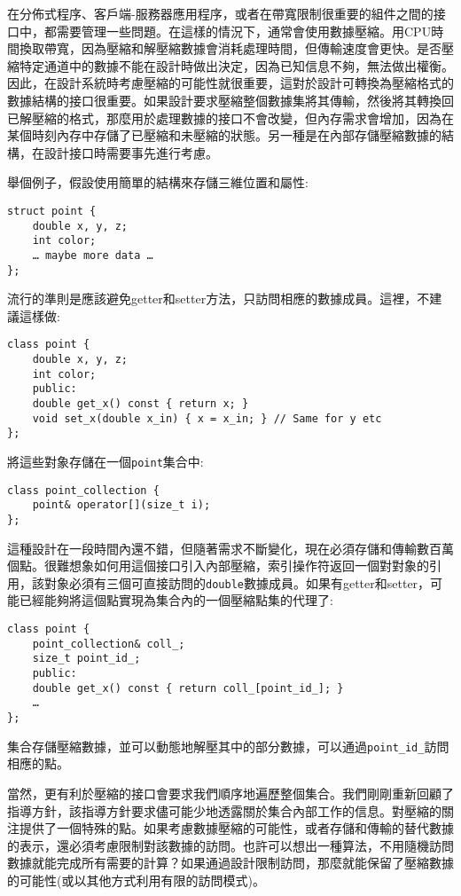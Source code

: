 在分佈式程序、客戶端-服務器應用程序，或者在帶寬限制很重要的組件之間的接口中，都需要管理一些問題。在這樣的情況下，通常會使用數據壓縮。用CPU時間換取帶寬，因為壓縮和解壓縮數據會消耗處理時間，但傳輸速度會更快。是否壓縮特定通道中的數據不能在設計時做出決定，因為已知信息不夠，無法做出權衡。因此，在設計系統時考慮壓縮的可能性就很重要，這對於設計可轉換為壓縮格式的數據結構的接口很重要。如果設計要求壓縮整個數據集將其傳輸，然後將其轉換回已解壓縮的格式，那麼用於處理數據的接口不會改變，但內存需求會增加，因為在某個時刻內存中存儲了已壓縮和未壓縮的狀態。另一種是在內部存儲壓縮數據的結構，在設計接口時需要事先進行考慮。 

舉個例子，假設使用簡單的結構來存儲三維位置和屬性:

\begin{lstlisting}[style=styleCXX]
struct point {
	double x, y, z;
	int color;
	… maybe more data …
};
\end{lstlisting}

流行的準則是應該避免getter和setter方法，只訪問相應的數據成員。這裡，不建議這樣做:

\begin{lstlisting}[style=styleCXX]
class point {
	double x, y, z;
	int color;
	public:
	double get_x() const { return x; }
	void set_x(double x_in) { x = x_in; } // Same for y etc
};
\end{lstlisting}

將這些對象存儲在一個\texttt{point}集合中:

\begin{lstlisting}[style=styleCXX]
class point_collection {
	point& operator[](size_t i);
};
\end{lstlisting}

這種設計在一段時間內還不錯，但隨著需求不斷變化，現在必須存儲和傳輸數百萬個點。很難想象如何用這個接口引入內部壓縮，索引操作符返回一個對對象的引用，該對象必須有三個可直接訪問的\texttt{double}數據成員。如果有getter和setter，可能已經能夠將這個點實現為集合內的一個壓縮點集的代理了:

\begin{lstlisting}[style=styleCXX]
class point {
	point_collection& coll_;
	size_t point_id_;
	public:
	double get_x() const { return coll_[point_id_]; }
	…
};
\end{lstlisting}

集合存儲壓縮數據，並可以動態地解壓其中的部分數據，可以通過\texttt{point\_id\_}訪問相應的點。

當然，更有利於壓縮的接口會要求我們順序地遍歷整個集合。我們剛剛重新回顧了指導方針，該指導方針要求儘可能少地透露關於集合內部工作的信息。對壓縮的關注提供了一個特殊的點。如果考慮數據壓縮的可能性，或者存儲和傳輸的替代數據的表示，還必須考慮限制對該數據的訪問。也許可以想出一種算法，不用隨機訪問數據就能完成所有需要的計算？如果通過設計限制訪問，那麼就能保留了壓縮數據的可能性(或以其他方式利用有限的訪問模式)。

